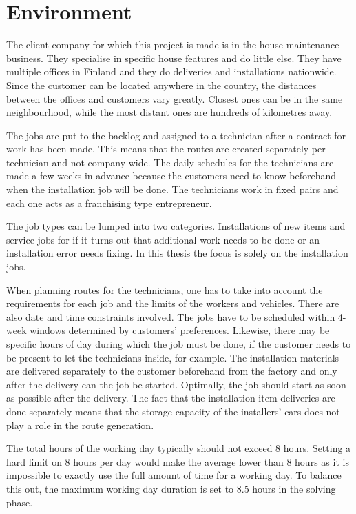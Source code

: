 \chapter{Environment}
\label{chapter:environment}

The client company for which this project is made is in the house maintenance business. They specialise in specific house features and do little else. They have multiple offices in Finland and they do deliveries and installations nationwide. Since the customer can be located anywhere in the country, the distances between the offices and customers vary greatly. Closest ones can be in the same neighbourhood, while the most distant ones are hundreds of kilometres away.

The jobs are put to the backlog and assigned to a technician after a contract for work has been made. This means that the routes are created separately per technician and not company-wide. The daily schedules for the technicians are made a few weeks in advance because the customers need to know beforehand when the installation job will be done. The technicians work in fixed pairs and each one acts as a franchising type entrepreneur.

The job types can be lumped into two categories. Installations of new items and service jobs for if it turns out that additional work needs to be done or an installation error needs fixing. In this thesis the focus is solely on the installation jobs.

When planning routes for the technicians, one has to take into account the requirements for each job and the limits of the workers and vehicles. There are also date and time constraints involved. The jobs have to be scheduled within 4-week windows determined by customers' preferences. Likewise, there may be specific hours of day during which the job must be done, if the customer needs to be present to let the technicians inside, for example. The installation materials are delivered separately to the customer beforehand from the factory and only after the delivery can the job be started. Optimally, the job should start as soon as possible after the delivery. The fact that the installation item deliveries are done separately means that the storage capacity of the installers' cars does not play a role in the route generation. 

The total hours of the working day typically should not exceed 8 hours. Setting a hard limit on 8 hours per day would make the average lower than 8 hours as it is impossible to exactly use the full amount of time for a working day. To balance this out, the maximum working day duration is set to 8.5 hours in the solving phase. 


